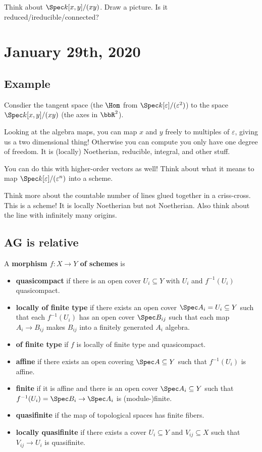 \documentclass[12pt]{article}
\begin{document}
Think about $\Spec k[x,y]/(xy)$. Draw a picture. Is it reduced/ireducible/connected?

\section{January 29th, 2020}
\subsection{Example}
Consdier the tangent space (the $\Hom$ from $\Spec k[\varepsilon]/(\varepsilon^2)$) to the space $\Spec k[x,y]/(xy)$ (the axes in $\bbR^2$).

Looking at the algebra maps, you can map $x$ and $y$ freely to multiples of $\varepsilon$, giving us a two dimensional thing! Otherwise you can compute you only have one 
degree of freedom. It is (locally) Noetherian, reducible, integral, and other stuff.

You can do this with higher-order vectors as well! Think about what it means to map $\Spec k[\varepsilon]/(\varepsilon^n)$ into a scheme.

\brk

Think more about the countable number of lines glued together in a criss-cross. This is a scheme! It is locally Noetherian but not Noetherian. Also think about the line with infinitely many origins.

\subsection{AG is relative}
\begin{defn}
	A \textbf{morphism $f:X\to Y$ of schemes} is 
	\begin{itemize}
		\item \textbf{quasicompact} if there is an open cover $U_i\subseteq Y$ with $U_i$ and $f^{-1}(U_i)$ quasicompact.
		\item \textbf{locally of finite type} if there exists an open cover $\Spec A_i=U_i\subseteq Y$ such that each $f^{-1}(U_i)$ has an open cover $\Spec B_{ij}$ such that each map $A_i\to B_{ij}$ 
		makes $B_{ij}$ into a finitely generated $A_i$ algebra.
		\item \textbf{of finite type} if $f$ is locally of finite type and quasicompact.
		\item \textbf{affine} if there exists an open covering $\Spec A\subseteq Y$ such that $f^{-1}(U_i)$ is affine.
		\item \textbf{finite} if it is affine and there is an open cover $\Spec A_i\subseteq Y$ such that $f^{-1}(U_i)=\Spec B_i\to \Spec A_i$ is (module-)finite.
		\item \textbf{quasifinite} if the map of topological spaces has finite fibers.
		\item \textbf{locally quasifinite} if there exists a cover $U_i\subseteq Y$ and $V_{ij}\subseteq X$ such that $V_{ij}\to U_i$ is quasifinite.
	\end{itemize}
\end{defn}
\end{document}
